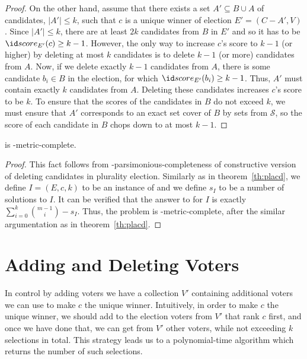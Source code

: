 \begin{proof}
On the other hand, assume that there exists a set $A'\subseteq B\cup A$ of candidates, $|A'|\le k$, such that $c$ is a unique winner of election $E'=(C-A',V)$.
Since $|A'|\le k$, there are at least $2k$ candidates from $B$ in $E'$ and so it has to be $\score{E'}(c)\ge k-1$.
However, the only way to increase $c$'s score to $k-1$ (or higher) by deleting at most $k$ candidates is to delete $k-1$ (or more) candidates from $A$.
Now, if we delete exactly $k-1$ candidates from $A$, there is some candidate $b_i\in B$ in the election, for which $\score{E'}(b_i)\ge k-1$.
Thus, $A'$ must contain exactly $k$ candidates from $A$.
Deleting these candidates increases $c$'s score to be $k$.
To ensure that the scores of the candidates in $B$ do not exceed $k$, we must ensure that $A'$ corresponds to an exact set cover of $B$ by sets from $\mathcal{S}$, so the score of each candidate in $B$ chops down to at most $k-1$.
\end{proof}

\begin{theorem} \label{th:pldcd}
	 is \sharpPclass-metric-complete.
\end{theorem}

\begin{proof}
This fact follows from \sharpPclass-parsimonious-completeness of constructive version of deleting candidates in plurality election.
Similarly as in theorem~\ref{th:placd}, we define $I=(E,c,k)$ to be an instance of  and we define $s_I$ to be a number of solutions to $I$.
It can be verified that the answer to  for $I$ is exactly $\sum_{i=0}^k\binom{m-1}{i}-s_I$.
Thus, the problem is \sharpPclass-metric-complete, after the similar argumentation as in theorem~\ref{th:placd}.
\end{proof}

\section{Adding and Deleting Voters} \label{sec:plvot}

In control by adding voters we have a collection $V'$ containing additional voters we can use to make $c$ the unique winner.
Intuitively, in order to make $c$ the unique winner, we should add to the election voters from $V'$ that rank $c$ first, and once we have done that, we can get from $V'$ other voters, while not exceeding $k$ selections in total.
This strategy leads us to a polynomial-time algorithm which returns the number of such selections.

